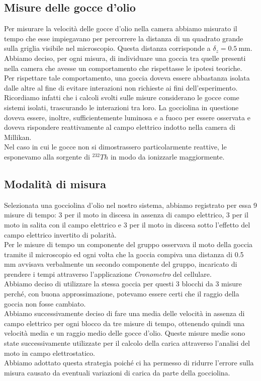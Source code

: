     \subsection{Misure delle gocce d'olio}
        Per misurare la velocità delle gocce d'olio nella camera abbiamo misurato il tempo che esse impiegavano per percorrere la distanza di un quadrato grande sulla griglia visibile nel microscopio.
        Questa distanza corrisponde a
        $\delta_{z}=0.5~\mathrm{mm}$.
        Abbiamo deciso, per ogni misura, di individuare una goccia tra quelle presenti nella camera che avesse un comportamento che rispettasse le ipotesi teoriche.\\
        Per rispettare tale comportamento, una goccia doveva essere abbastanza isolata dalle altre al fine di evitare interazioni non richieste ai fini dell'esperimento. Ricordiamo infatti che i calcoli svolti sulle misure considerano le gocce come sistemi isolati, trascurando le interazioni tra loro. La gocciolina in questione doveva essere, inoltre, sufficientemente luminosa e a fuoco per essere osservata e doveva rispondere reattivamente al campo elettrico indotto nella camera di Millikan.\\
        Nel caso in cui le gocce non si dimostrassero particolarmente reattive, le esponevamo alla sorgente di \textit{$^{232}Th$} in modo da ionizzarle maggiormente.\\
    \subsection{Modalità di misura}
        Selezionata una gocciolina d'olio nel nostro sistema, abbiamo registrato per essa 9 misure di tempo: 3 per il moto in discesa in assenza di campo elettrico, 3 per il moto in salita con il campo elettrico e 3 per il moto in discesa sotto l'effetto del campo elettrico invertito di polarità.\\
        Per le misure di tempo un componente del gruppo osservava il moto della goccia tramite il microscopio ed ogni volta che la goccia compiva una distanza di 0.5 mm avvisava verbalmente un secondo componente del gruppo, incaricato di prendere i tempi attraverso l'applicazione \textit{Cronometro} del cellulare.\\  
        Abbiamo deciso di utilizzare la stessa goccia per questi 3 blocchi da 3 misure perché, con buona approssimazione, potevamo essere certi che il raggio della goccia non fosse cambiato.\\
        Abbiamo successivamente deciso di fare una media delle velocità in assenza di campo elettrico per ogni blocco da tre misure di tempo, ottenendo quindi una velocità media e un raggio medio delle gocce d'olio. Queste misure medie sono state successivamente utilizzate per il calcolo della carica attraverso l'analisi del moto in campo elettrostatico.\\
        Abbiamo adottato questa strategia poiché ci ha permesso di ridurre l'errore sulla misura causato da eventuali variazioni di carica da parte della gocciolina.

